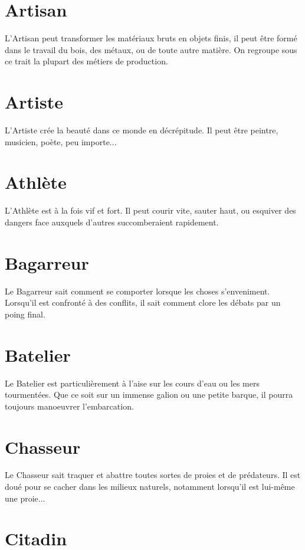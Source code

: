 \documentclass[a4paper,10pt,twoside,twocolumn,openany,bg=print,justified]{dndbook}
\begin{document}
\section*{Artisan}

L'Artisan peut transformer les matériaux bruts en objets finis, il peut être formé dans le travail du bois, des métaux, ou de toute autre matière. On regroupe sous ce trait la plupart des métiers de production.

\section*{Artiste}

L'Artiste crée la beauté dans ce monde en décrépitude. Il peut être peintre, musicien, poète, peu importe...

\section*{Athlète}

L'Athlète est à la fois vif et fort. Il peut courir vite, sauter haut, ou esquiver des dangers face auxquels d'autres succomberaient rapidement.

\section*{Bagarreur}

Le Bagarreur sait comment se comporter lorsque les choses s'enveniment. Lorsqu'il est confronté à des conflits, il sait comment clore les débats par un poing final.

\section*{Batelier}

Le Batelier est particulièrement à l'aise sur les cours d'eau ou les mers tourmentées. Que ce soit sur un immense galion ou une petite barque, il pourra toujours manoeuvrer l'embarcation.

\section*{Chasseur}

Le Chasseur sait traquer et abattre toutes sortes de proies et de prédateurs. Il est doué pour se cacher dans les milieux naturels, notamment lorsqu'il est lui-même une proie...

\section*{Citadin}
\end{document}
